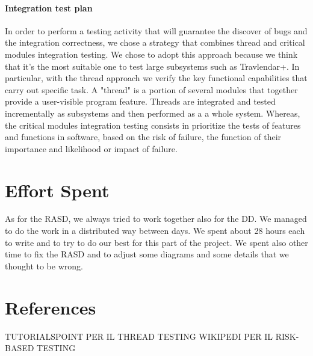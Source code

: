 \documentclass[12pt,titlepage]{article}
\begin{document}
\paragraph{Integration test plan}
In order to perform a testing activity that will guarantee the discover of bugs and the integration correctness, we chose a strategy that combines thread and critical modules integration testing. We chose to adopt this approach because we think that it's the most suitable one to test large subsystems such as Travlendar+.
In particular, with the thread approach we verify the key functional capabilities that carry out specific task. A "thread" is a portion of several modules that together provide a user-visible program feature. Threads are integrated and tested incrementally as subsystems and then performed as a a whole system.
Whereas, the critical modules integration testing consists in prioritize the tests of features and functions in software, based on the risk of failure, the function of their importance and likelihood or impact of failure. 

\pagebreak

\section{Effort Spent}
As for the RASD, we always tried to work together also for the DD. We managed to do the work in a distributed way between days. We spent about 28 hours each to write and to try to do our best for this part of the project.
We spent also other time to fix the RASD and to adjust some diagrams and some details that we thought to be wrong.

\section{References}
TUTORIALSPOINT PER IL THREAD TESTING
WIKIPEDI PER IL RISK-BASED TESTING
\end{document}
